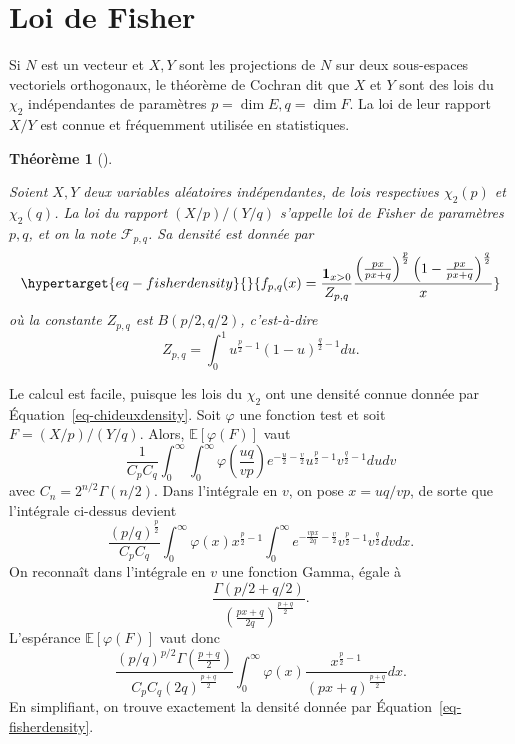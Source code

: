 \documentclass[
  10,
  letterpaper,
  DIV=11,
  numbers=noendperiod]{scrreport}
\theoremstyle{plain}
\newtheorem{theorem}{Théorème}[chapter]
\theoremstyle{definition}
\theoremstyle{plain}
\theoremstyle{definition}
\theoremstyle{definition}
\theoremstyle{plain}
\theoremstyle{remark}
\begin{document}
\hypertarget{sec-fisher}{%
\section{Loi de Fisher}\label{sec-fisher}}

Si \(N\) est un vecteur et \(X,Y\) sont les projections de \(N\) sur
deux sous-espaces vectoriels orthogonaux, le théorème de Cochran dit que
\(X\) et \(Y\) sont des lois du \(\chi_2\) indépendantes de paramètres
\(p=\dim E, q = \dim F\). La loi de leur rapport \(X/Y\) est connue et
fréquemment utilisée en statistiques.

\begin{theorem}[]\protect\hypertarget{thm-fisher}{}\label{thm-fisher}

Soient \(X,Y\) deux variables aléatoires indépendantes, de lois
respectives \(\chi_2(p)\) et \(\chi_2(q)\). La loi du rapport
\((X/p)/(Y/q)\) s'appelle loi de Fisher de paramètres \(p,q\), et on la
note \(\mathscr{F}_{p,q}\). Sa densité est donnée par
\begin{equation}\protect\hypertarget{eq-fisherdensity}{}{ f_{p,q}(x) = \frac{\mathbf{1}_{x>0}}{Z_{p,q}}\frac{\left(\frac{px}{px + q}\right)^{\frac{p}{2}} \left(1 - \frac{px}{px + q}\right)^{\frac{q}{2}}}{x}}\label{eq-fisherdensity}\end{equation}
où la constante \(Z_{p,q}\) est \(B(p/2, q/2)\), c'est-à-dire
\[ Z_{p,q} =  \int_0^1 u^{\frac{p}{2}-1}(1-u)^{\frac{q}{2}-1}du.\]

\end{theorem}

Le calcul est facile, puisque les lois du \(\chi_2\) ont une densité
connue donnée par Équation~\ref{eq-chideuxdensity}. Soit \(\varphi\) une
fonction test et soit \(F = (X/p)/(Y/q)\). Alors,
\(\mathbb{E}[\varphi(F)]\) vaut
\[\frac{1}{C_p C_q}\int_0^\infty \int_0^\infty \varphi\left(\frac{uq}{vp}\right)e^{-\frac{u}{2}-\frac{v}{2}}u^{\frac{p}{2}-1}v^{\frac{q}{2}-1}dudv \]
avec \(C_n = 2^{n/2}\Gamma(n/2)\). Dans l'intégrale en \(v\), on pose
\(x = uq/vp\), de sorte que l'intégrale ci-dessus devient
\[\frac{(p/q)^{\frac{p}{2}}}{C_p C_q}\int_0^\infty \varphi(x) x^{\frac{p}{2}-1}\int_0^\infty e^{-\frac{vpx}{2q}-\frac{v}{2}}v^{\frac{p}{2}-1}v^{\frac{q}{2}}dv dx. \]
On reconnaît dans l'intégrale en \(v\) une fonction Gamma, égale à
\[\frac{\Gamma(p/2 + q/2)}{\left(\frac{px+q}{2q}\right)^{\frac{p+q}{2}}}.\]
L'espérance \(\mathbb{E}[\varphi(F)]\) vaut donc
\[\frac{(p/q)^{p/2}\Gamma\left(\frac{p+q}{2}\right)}{C_p C_q (2q)^{\frac{p+q}{2}}}\int_0^\infty \varphi(x)\frac{x^{\frac{p}{2}-1}}{(px + q)^{\frac{p+q}{2}}}dx. \]
En simplifiant, on trouve exactement la densité donnée par
Équation~\ref{eq-fisherdensity}.
\end{document}
